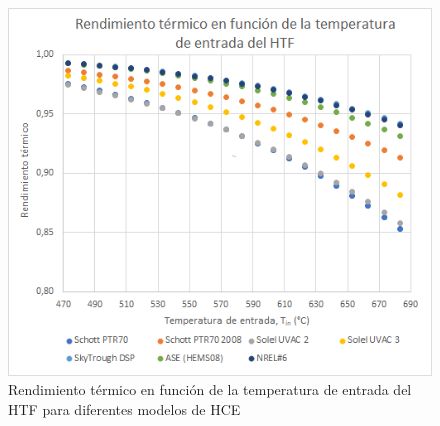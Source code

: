 \begin{figure}
\includegraphics[scale=0.8]{images/resultados_test2a.png}
\caption{Rendimiento térmico en función de la temperatura de entrada del HTF para diferentes modelos de HCE} 
\label{fig:test2a}
\end{figure}




